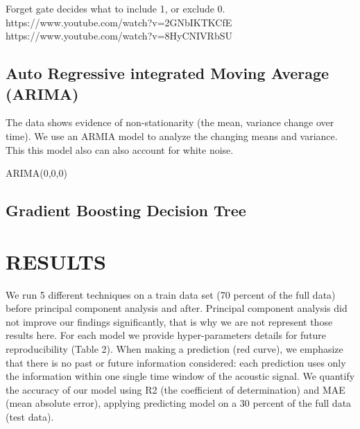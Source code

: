 \documentclass[]{llncs}
\begin{document}
Forget gate decides what to include 1, or exclude 0. 
https://www.youtube.com/watch?v=2GNbIKTKCfE
https://www.youtube.com/watch?v=8HyCNIVRbSU

\subsection{Auto Regressive integrated Moving Average (ARIMA)}
The data shows evidence of non-stationarity (the mean, variance change over time). We use an ARMIA model to analyze the changing means and variance. This this model also can also account for white noise.\par ARIMA(0,0,0)

\subsection{Gradient Boosting Decision Tree}


\section{RESULTS}

We run 5 different techniques on a train data set (70 percent of the full data) before principal component analysis and after. Principal component analysis did not improve our findings significantly, that is why we are not represent those results here. For each model we provide hyper-parameters details for future reproducibility (Table 2).
When making a prediction (red curve), we emphasize that there is no past or future information considered: each prediction uses only the information within one single time window of the acoustic signal. We quantify the accuracy of our model using R2 (the coefficient of determination) and MAE (mean absolute error), applying predicting model on a 30 percent of the full data (test data).


\end{document}
